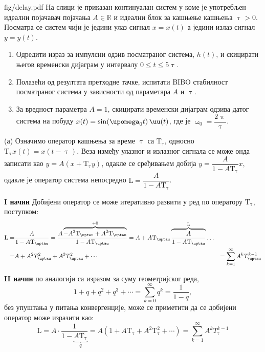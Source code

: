 \begin{slikaDesno}{fig/delay.pdf}
\PID На слици је приказан континуалан систем у 
коме је употребљен идеални појачавач
појачања $A \in \mathbb R$ и 
идеални блок за кашњење
кашњења $\uptau > 0$. Посматра се систем 
чији је 
једини улаз 
сигнал $x = x(t)$ а једини излаз
сигнал $y = y(t)$. 
\end{slikaDesno}


\begin{enumerate}[label=(\alph*)]
    \item Одредити израз за импулсни 
    одзив посматраног система, $h(t)$, 
    и скицирати 
    његов временски дијаграм у интервалу 
    $0 \leq t \leq 5\uptau$. 
    
    \item Полазећи од резултата 
    претходне тачке, испитати BIBO
    стабилност посматраног система у
    зависности од параметара $A$ и 
    $\uptau$. 
    
    \item За вредност параметра $A = 1$, 
    скицирати временски 
    дијаграм одзива датог система на побуду
    $x(t) = \sin(\upomega_0 t)\,\uu(t)$, где је 
    $\upomega_0 = \dfrac{2\uppi}{\uptau}$.     
\end{enumerate} 

\textsc{} 
(а) Означимо оператор кашњења за време $\uptau$ са $\mathrm T_{\uptau}$, односно 
$\mathrm T_{\uptau} x(t) = x(t - \uptau)$. Веза између улазног и излазног
сигнала се може онда записати као $y = A(x + \mathrm T_{\uptau} y)$, одакле се сређивањем добија 
$
    y = \dfrac{A}{1 - A\mathrm T_{\uptau}}  x
$, одакле је оператор система непосредно $\mathrm L = \dfrac{A}{1 - A\mathrm T_{\uptau}}$. 

\textbf{I начин}
Добијени оператор се може итеративно развити у ред по оператору $\mathrm T_{\uptau}$, поступком:
\begin{align}
    \textrm L =& \dfrac{A}{1 - A\mathrm T_{\uptau}} = 
                \dfrac{A \overbrace{- A^2 \mathrm T_{\uptau} + A^2 \mathrm T_{\uptau}}^{+0} }{1 - A\mathrm T_{\uptau}} 
              = A + A\mathrm T_{\uptau} \overbrace{ \dfrac{A}{1 - A\mathrm T_{\uptau}} }^{\mathrm L}  \ldots & \\
              =& A + A^2 T_{\uptau}^2 + A^3 T_{\uptau}^2 + \cdots & 
              = \sum_{k = 1}^{\infty} A^{k} T_{\uptau}^{k-1} \label{\ID.eq1}
\end{align}

\textbf{II начин} по аналогији са изразом за суму геометријског реда,
\begin{equation}
    1 + q + q^2 + q^3 + \cdots = \sum_{k=0}^{\infty} q^k = \dfrac{1}{1 - q},
\end{equation}
без упуштања у питања конвергенције, може се приметити да се добијени оператор може изразити као:
\begin{equation}
    \mathrm L = A\cdot \dfrac{1}{1 - \underbrace{A\mathrm T_{\uptau}}_{q} } =  
               A(1 + A\mathrm T_{\uptau} + A^2\mathrm T_{\uptau}^2 + \cdots) = \sum_{k = 1}^{\infty} A^{k} T_{\uptau}^{k-1} \label{\ID.eq2}
\end{equation}

